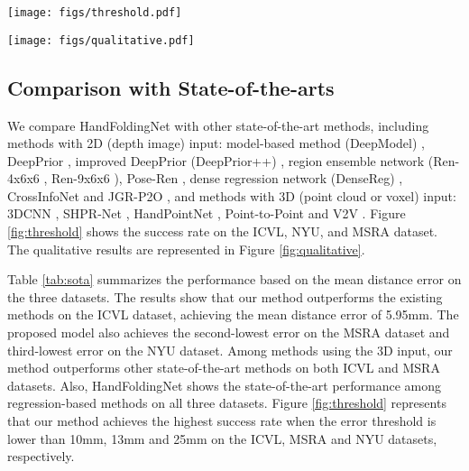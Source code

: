 \documentclass[10pt,twocolumn,letterpaper]{article}
\begin{document}
\begin{figure*}
\centering
\texttt{[image: figs/threshold.pdf]}
\caption{Comparison with the state-of-the-art methods using the ICVL (left), MSRA (middle) and NYU (right) dataset. The success rate is shown in this figure.}
\label{fig:threshold}
\end{figure*}

\begin{figure*}
\centering
\texttt{[image: figs/qualitative.pdf]}
\caption{Qualitative results of HandFoldingNet on the ICVL (left), MSRA (middle) and NYU (right) dataset. Hand depth images are transformed into 3D points as shown in the figure. Ground truth is shown in black, and the estimated joint coordinates are shown in red.}
\label{fig:qualitative}
\end{figure*}

\subsection{Comparison with State-of-the-arts}

We compare HandFoldingNet with other state-of-the-art methods, including methods with 2D (depth image) input: model-based method (DeepModel) \cite{zhou2016model}, DeepPrior \cite{oberweger2015hands}, improved DeepPrior (DeepPrior++) \cite{oberweger2017deepprior++}, region ensemble network (Ren-4x6x6 \cite{guo2017region}, Ren-9x6x6 \cite{wan2018dense}), Pose-Ren \cite{chen2020pose}, dense regression network (DenseReg) \cite{wan2018dense}, CrossInfoNet \cite{du2019crossinfonet} and JGR-P2O \cite{fang2020jgr}, and methods with 3D (point cloud or voxel) input: 3DCNN \cite{ge20173d}, SHPR-Net \cite{chen2018shpr}, HandPointNet \cite{ge2018hand}, Point-to-Point \cite{ge2018point} and V2V \cite{moon2018v2v}. Figure \ref{fig:threshold} shows the success rate on the ICVL, NYU, and MSRA dataset.
The qualitative results are represented in Figure \ref{fig:qualitative}.


Table \ref{tab:sota} summarizes the performance based on the mean distance error on the three datasets. The results show that our method outperforms the existing methods on the ICVL dataset, achieving the mean distance error of 5.95mm. The proposed model also achieves the second-lowest error on the MSRA dataset and third-lowest error on the NYU dataset. Among methods using the 3D input, our method outperforms other state-of-the-art methods on both ICVL and MSRA datasets. Also, HandFoldingNet shows the state-of-the-art performance among regression-based methods on all three datasets. 
Figure \ref{fig:threshold} represents that our method achieves the highest success rate when the error threshold is lower than 10mm, 13mm and 25mm on the ICVL, MSRA and NYU datasets, respectively.
\end{document}
